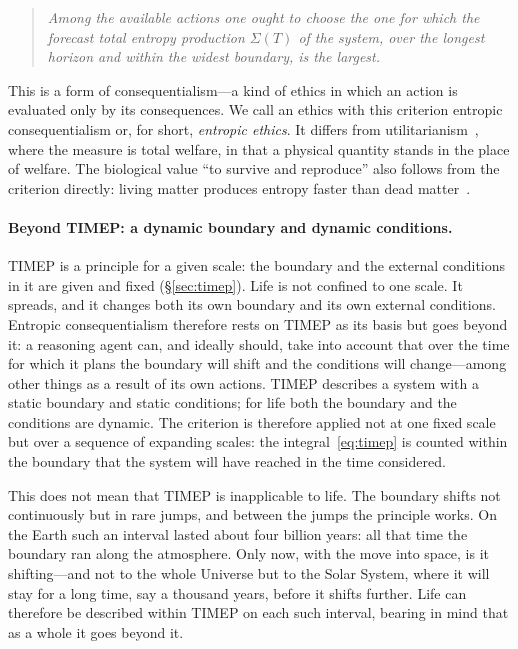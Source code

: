 \documentclass[11pt,a4paper]{article}
\newcommand{\Sref}[1]{\hyperref[#1]{\S\ref{#1}}}
\begin{document}
\begin{quote}
\emph{Among the available actions one ought to choose the one for which the forecast total entropy production $\Sigma(T)$ of the system, over the longest horizon and within the widest boundary, is the largest.}
\end{quote}

This is a form of consequentialism---a kind of ethics in which an action is evaluated only by its consequences. We call an ethics with this criterion entropic consequentialism or, for short, \emph{entropic ethics}. It differs from utilitarianism~\cite{bentham1789,mill1863}, where the measure is total welfare, in that a physical quantity stands in the place of welfare. The biological value ``to survive and reproduce'' also follows from the criterion directly: living matter produces entropy faster than dead matter~\cite{ulanowicz1987,schneider1994,kleidon2010}.

\paragraph{Beyond TIMEP: a dynamic boundary and dynamic conditions.}
TIMEP is a principle for a given scale: the boundary and the external conditions in it are given and fixed (\Sref{sec:timep}). Life is not confined to one scale. It spreads, and it changes both its own boundary and its own external conditions. Entropic consequentialism therefore rests on TIMEP as its basis but goes beyond it: a reasoning agent can, and ideally should, take into account that over the time for which it plans the boundary will shift and the conditions will change---among other things as a result of its own actions. TIMEP describes a system with a static boundary and static conditions; for life both the boundary and the conditions are dynamic. The criterion is therefore applied not at one fixed scale but over a sequence of expanding scales: the integral~\eqref{eq:timep} is counted within the boundary that the system will have reached in the time considered.

This does not mean that TIMEP is inapplicable to life. The boundary shifts not continuously but in rare jumps, and between the jumps the principle works. On the Earth such an interval lasted about four billion years: all that time the boundary ran along the atmosphere. Only now, with the move into space, is it shifting---and not to the whole Universe but to the Solar System, where it will stay for a long time, say a thousand years, before it shifts further. Life can therefore be described within TIMEP on each such interval, bearing in mind that as a whole it goes beyond it.
\end{document}
